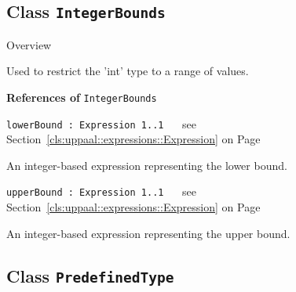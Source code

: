 \subsection{Class \bfseries \texttt{IntegerBounds}\normalfont}
\label{cls:uppaal::types::IntegerBounds} 
	
	\begin{longdescription}
		\item[Overview] 		
				

	

		Used to restrict the 'int' type to a range of values.		
		
	
			\item[\textbf{References of} \texttt{IntegerBounds}] ~
			\begin{longdescription}
	\item[\texttt{lowerBound : Expression 	\symbol{"5B}1..1\symbol{"5D}
}] ~
	see Section~\ref{cls:uppaal::expressions::Expression} on Page~\pageref{cls:uppaal::expressions::Expression}
	
	\nopagebreak
		
				

	

		An integer-based expression representing the lower bound.		
	\item[\texttt{upperBound : Expression 	\symbol{"5B}1..1\symbol{"5D}
}] ~
	see Section~\ref{cls:uppaal::expressions::Expression} on Page~\pageref{cls:uppaal::expressions::Expression}
	
	\nopagebreak
		
				

	

		An integer-based expression representing the upper bound.		
			\end{longdescription}
	
	\end{longdescription}
	

\subsection{Class \bfseries \texttt{PredefinedType}\normalfont}
\label{cls:uppaal::types::PredefinedType} 
	
